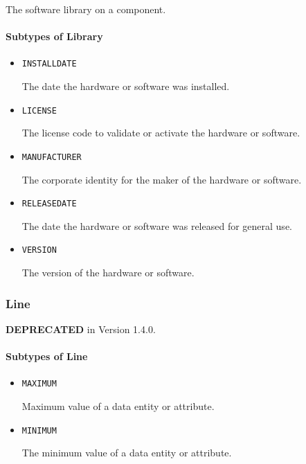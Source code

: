 The software library on a component.



\paragraph{Subtypes of Library}\mbox{}
\label{sec:Subtypes of Library}

\begin{itemize}

\item \texttt{INSTALL\textunderscore DATE}


The date the hardware or software was installed.

\item \texttt{LICENSE}


The license code to validate or activate the hardware or software.

\item \texttt{MANUFACTURER}


The corporate identity for the maker of the hardware or software.


\item \texttt{RELEASE\textunderscore DATE}


The date the hardware or software was released for general use.


\item \texttt{VERSION}


The version of the hardware or software.


\end{itemize}








\subsubsection{Line}
\label{sec:Line}



\textbf{DEPRECATED} in Version 1.4.0.


\paragraph{Subtypes of Line}\mbox{}
\label{sec:Subtypes of Line}

\begin{itemize}

\item \texttt{MAXIMUM}


Maximum value of a data entity or attribute.

\item \texttt{MINIMUM}


The minimum value of a data entity or attribute.


\end{itemize}





